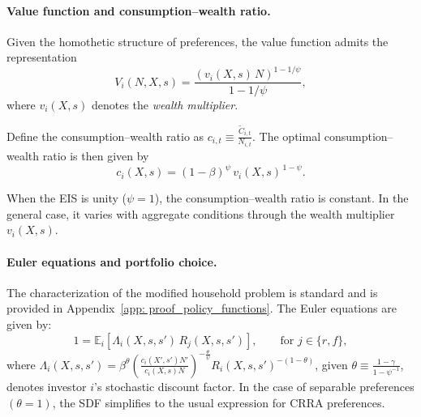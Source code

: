 
\paragraph{Value function and consumption--wealth ratio.}

Given the homothetic structure of preferences, the value function admits the representation
\begin{equation}\label{eq: value_function}
V_i(N,X,s)
=
\frac{\left(v_i(X,s)\,N\right)^{1-1/\psi}}{1-1/\psi},
\end{equation}
where $v_i(X,s)$ denotes the \emph{wealth multiplier}.

Define the consumption--wealth ratio as
$
c_{i,t}
\equiv
\frac{\tilde C_{i,t}}{N_{i,t}}.
$
The optimal consumption--wealth ratio is then given by
\begin{equation}\label{eq: consumption_wealth_ratio}
c_i(X,s)
=
(1-\beta)^{\psi}\,v_i(X,s)^{\,1-\psi}.
\end{equation}

When the EIS is unity ($\psi=1$), the
consumption--wealth ratio is constant. In the general case, it varies with aggregate
conditions through the wealth multiplier $v_i(X,s)$.

\paragraph{Euler equations and portfolio choice.}

The characterization of the modified household problem is standard and is provided in
Appendix~\ref{app: proof_policy_functions}. The Euler equations are given by:
\begin{equation}
1
=
\mathbb E_i\!\left[
\Lambda_i(X,s,s')\,R_j(X,s,s')
\right], \qquad \text{for } j\in\{r,f\},
\label{eq:eulers}
\end{equation}
where $\Lambda_i(X,s,s') =\beta^{\theta}\left(\frac{c_{i}(X',s')N'}{c_{i}(X,s)N}\right)^{-\frac{\theta}{\psi}}R_{i}(X,s,s')^{-(1-\theta)}$, given $\theta \equiv \frac{1-\gamma}{1-\psi^{-1}}$, denotes investor $i$'s stochastic discount
factor.
In the case of separable preferences $(\theta = 1)$, the SDF simplifies to the usual expression for CRRA preferences.

